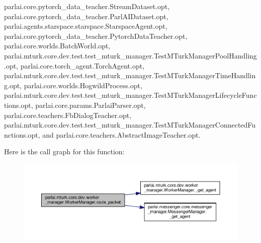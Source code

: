 parlai.\+core.\+pytorch\+\_\+data\+\_\+teacher.\+Stream\+Dataset.\+opt, parlai.\+core.\+pytorch\+\_\+data\+\_\+teacher.\+Parl\+A\+I\+Dataset.\+opt, parlai.\+agents.\+starspace.\+starspace.\+Starspace\+Agent.\+opt, parlai.\+core.\+pytorch\+\_\+data\+\_\+teacher.\+Pytorch\+Data\+Teacher.\+opt, parlai.\+core.\+worlds.\+Batch\+World.\+opt, parlai.\+mturk.\+core.\+dev.\+test.\+test\+\_\+mturk\+\_\+manager.\+Test\+M\+Turk\+Manager\+Pool\+Handling.\+opt, parlai.\+core.\+torch\+\_\+agent.\+Torch\+Agent.\+opt, parlai.\+mturk.\+core.\+dev.\+test.\+test\+\_\+mturk\+\_\+manager.\+Test\+M\+Turk\+Manager\+Time\+Handling.\+opt, parlai.\+core.\+worlds.\+Hogwild\+Process.\+opt, parlai.\+mturk.\+core.\+dev.\+test.\+test\+\_\+mturk\+\_\+manager.\+Test\+M\+Turk\+Manager\+Lifecycle\+Functions.\+opt, parlai.\+core.\+params.\+Parlai\+Parser.\+opt, parlai.\+core.\+teachers.\+Fb\+Dialog\+Teacher.\+opt, parlai.\+mturk.\+core.\+dev.\+test.\+test\+\_\+mturk\+\_\+manager.\+Test\+M\+Turk\+Manager\+Connected\+Functions.\+opt, and parlai.\+core.\+teachers.\+Abstract\+Image\+Teacher.\+opt.

Here is the call graph for this function\+:
\nopagebreak
\begin{figure}[H]
\begin{center}
\leavevmode
\includegraphics[width=350pt]{classparlai_1_1mturk_1_1core_1_1dev_1_1worker__manager_1_1WorkerManager_a64541274656cb7cc6890da1625c0bb2b_cgraph}
\end{center}
\end{figure}
\mbox{\label{classparlai_1_1mturk_1_1core_1_1dev_1_1worker__manager_1_1WorkerManager_a4ef70d1871be031e2260ac6948fd3dba}} 
